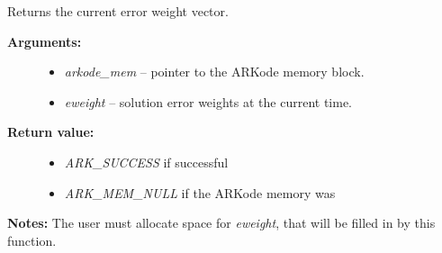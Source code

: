 \documentclass[letterpaper,10pt,english]{sphinxmanual}
\begin{document}
\begin{fulllineitems}
\label{c_interface/User_callable:ARKodeGetErrWeights}
Returns the current error weight vector.
\begin{description}
\item[{\textbf{Arguments:}}] \leavevmode\begin{itemize}
\item {} 
\emph{arkode\_mem} -- pointer to the ARKode memory block.

\item {} 
\emph{eweight} -- solution error weights at the current time.

\end{itemize}

\item[{\textbf{Return value:}}] \leavevmode\begin{itemize}
\item {} 
\emph{ARK\_SUCCESS} if successful

\item {} 
\emph{ARK\_MEM\_NULL} if the ARKode memory was 

\end{itemize}

\end{description}

\textbf{Notes:} The user must allocate space for \emph{eweight}, that will be
filled in by this function.

\end{fulllineitems}

\end{document}
